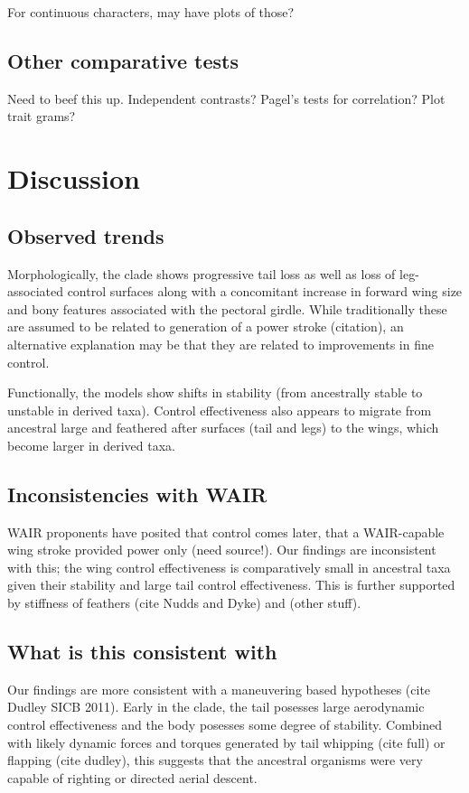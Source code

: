 For continuous characters, may have plots of those? 

\subsection{Other comparative tests}
Need to beef this up. Independent contrasts?  Pagel's tests for correlation?  Plot trait grams? 









\section{Discussion}
\subsection{Observed trends}
Morphologically, the clade shows progressive tail loss as well as loss of leg-associated control surfaces along with a concomitant increase in forward wing size and bony features associated with the pectoral girdle.  While traditionally these are assumed to be related to generation of a power stroke (citation), an alternative explanation may be that they are related to improvements in fine control. 

Functionally, the models show shifts in stability (from ancestrally stable to unstable in derived taxa).  Control effectiveness also appears to migrate from ancestral large and feathered after surfaces (tail and legs) to the wings, which become larger in derived taxa.   

\subsection{Inconsistencies with WAIR}
WAIR proponents have posited that control comes later, that a WAIR-capable wing stroke provided power only (need source!).  Our findings are inconsistent with this; the wing control effectiveness is comparatively small in ancestral taxa given their stability and large tail control effectiveness.  This is further supported by stiffness of feathers (cite Nudds and Dyke) and (other stuff). 

\subsection{What is this consistent with}
Our findings are more consistent with a maneuvering based hypotheses (cite Dudley SICB 2011). Early in the clade, the tail posesses large aerodynamic control effectiveness and the body posesses some degree of stability.  Combined with likely dynamic forces and torques generated by tail whipping (cite full) or flapping (cite dudley), this suggests that the ancestral organisms were very capable of righting or directed aerial descent.  

